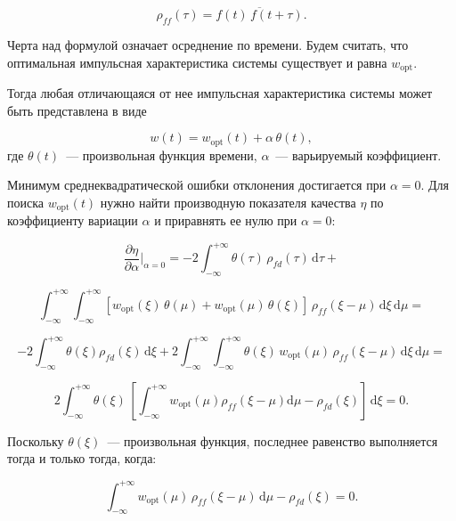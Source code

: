\begin{equation*}
\rho_{ff}(\tau)=\overline{f(t)\,f(t+\tau)}.
\end{equation*}


Черта над формулой означает осреднение по времени. Будем считать, что оптимальная импульсная характеристика системы существует и равна $w_\text{opt}$.

Тогда любая отличающаяся от нее импульсная характеристика системы может быть представлена в виде

\begin{equation}
	w(t) = w_\text{opt}(t)+\alpha\,\theta(t),
\end{equation}
где $\theta(t)$ --- произвольная функция времени, $\alpha$ --- варьируемый коэффициент.

Минимум среднеквадратической ошибки отклонения достигается при $\alpha=0$. Для поиска $w_\text{opt}(t)$ нужно найти производную показателя качества $\eta$ по коэффициенту вариации $\alpha$ и приравнять ее нулю при $\alpha=0$:

\begin{equation*}
	\frac{\partial\eta}{\partial\alpha}|_{\alpha=0} = -2\int_{-\infty}^{+\infty}\theta(\tau)\,\rho_{fd}(\tau)\, \mathrm{d}\tau +
\end{equation*}

\begin{equation*}
	\int_{-\infty}^{+\infty}\int_{-\infty}^{+\infty} \left[w_\text{opt}(\xi)\,\theta(\mu) + w_\text{opt}(\mu)\,\theta(\xi)\right] \,\rho_{ff}(\xi-\mu) \,\mathrm{d}\xi \,\mathrm{d}\mu =
\end{equation*}

\begin{equation*}
	-2\int_{-\infty}^{+\infty}\theta(\xi)\rho_{fd}(\xi)\,\mathrm{d}\xi + 2 \int_{-\infty}^{+\infty}\int_{-\infty}^{+\infty}\theta(\xi)\, w_\text{opt}(\mu)\,\rho_{ff}(\xi-\mu)\,\mathrm{d}\xi\, \mathrm{d} \mu =
\end{equation*}

\begin{equation}
	2\int_{-\infty}^{+\infty} \theta(\xi)\, \left[\int_{-\infty}^{+\infty}w_\text{opt}(\mu)\rho_{ff}(\xi-\mu)\mathrm{d}\mu- \rho_{fd}(\xi) \right]\, \mathrm{d}\xi = 0.
\end{equation}


Поскольку $\theta(\xi)$ — произвольная функция, последнее равенство выполняется тогда и только тогда, когда:

\begin{equation}
	\int_{-\infty}^{+\infty} w_\text{opt}(\mu)\, \rho_{ff}(\xi-\mu)\, \mathrm{d}\mu-\rho_{fd}(\xi)=0.
\end{equation}


